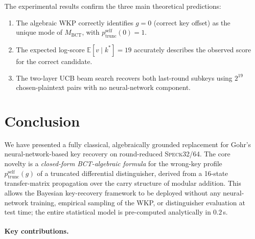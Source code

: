 \documentclass[runningheads]{llncs}
\newcommand{\pself}{p^{\mathrm{self}}_{\mathrm{trunc}}}
\newcommand{\speck}{\textsc{Speck}32/64}
\begin{document}
The experimental results confirm the three main theoretical predictions:
\begin{enumerate}
  \item The algebraic WKP correctly identifies $g = 0$ (correct key offset)
        as the unique mode of $M_{\mathrm{BCT}}$, with $\pself(0) = 1$.
  \item The expected log-score $\mathbb{E}[v \mid k^*] = 19$ accurately
        describes the observed score for the correct candidate.
  \item The two-layer UCB beam search recovers both last-round subkeys
        using $2^{19}$ chosen-plaintext pairs with no neural-network component.
\end{enumerate}

\section{Conclusion}
\label{sec:conclusion}

We have presented a fully classical, algebraically grounded replacement
for Gohr's neural-network-based key recovery on round-reduced \speck{}.
The core novelty is a \emph{closed-form BCT-algebraic formula} for the
wrong-key profile $\pself(g)$ of a truncated differential distinguisher,
derived from a 16-state transfer-matrix propagation over the carry
structure of modular addition.  This allows the Bayesian key-recovery
framework to be deployed without any neural-network training, empirical
sampling of the WKP, or distinguisher evaluation at test time; the entire
statistical model is pre-computed analytically in $0.2$\,s.

\paragraph{Key contributions.}
\end{document}
